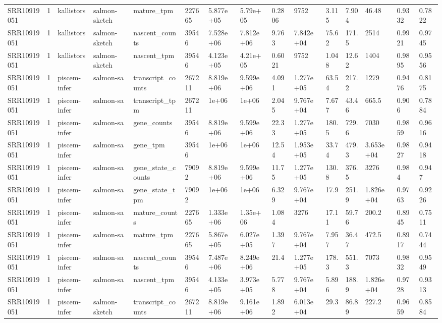 \begin{tabular}{lllllllllllllll}
SRR10919051 & 1 & kallistors & salmon-sketch & mature\_tpm & 227665 & 5.877e+05 & 5.79e+05 & 0.2806 & 9752 & 3.115 & 7.904 & 46.48 & 0.9332 & 0.7822 \\
SRR10919051 & 1 & kallistors & salmon-sketch & nascent\_counts & 39546 & 7.528e+06 & 7.812e+06 & 9.763 & 7.842e+04 & 75.62 & 171.5 & 2514 & 0.9921 & 0.9745 \\
SRR10919051 & 1 & kallistors & salmon-sketch & nascent\_tpm & 39546 & 4.123e+05 & 4.21e+05 & 0.6021 & 9752 & 1.048 & 12.62 & 1404 & 0.9895 & 0.9556 \\
SRR10919051 & 1 & piscem-infer & salmon-sa & transcript\_counts & 267211 & 8.819e+06 & 9.599e+06 & 4.091 & 1.277e+05 & 63.54 & 217.2 & 1279 & 0.9476 & 0.8175 \\
SRR10919051 & 1 & piscem-infer & salmon-sa & transcript\_tpm & 267211 & 1e+06 & 1e+06 & 2.045 & 9.767e+04 & 7.677 & 43.46 & 665.5 & 0.906 & 0.7884 \\
SRR10919051 & 1 & piscem-infer & salmon-sa & gene\_counts & 39546 & 8.819e+06 & 9.599e+06 & 22.33 & 1.277e+05 & 180.5 & 729.6 & 7030 & 0.9859 & 0.9616 \\
SRR10919051 & 1 & piscem-infer & salmon-sa & gene\_tpm & 39546 & 1e+06 & 1e+06 & 12.54 & 1.953e+05 & 33.74 & 479.3 & 3.653e+04 & 0.9827 & 0.9418 \\
SRR10919051 & 1 & piscem-infer & salmon-sa & gene\_state\_counts & 79092 & 8.819e+06 & 9.599e+06 & 11.75 & 1.277e+05 & 130.8 & 376.5 & 3276 & 0.984 & 0.947 \\
SRR10919051 & 1 & piscem-infer & salmon-sa & gene\_state\_tpm & 79092 & 1e+06 & 1e+06 & 6.329 & 9.767e+04 & 17.9 & 251.9 & 1.826e+04 & 0.9763 & 0.9226 \\
SRR10919051 & 1 & piscem-infer & salmon-sa & mature\_counts & 227665 & 1.333e+06 & 1.35e+06 & 1.084 & 3276 & 17.11 & 59.76 & 200.2 & 0.8945 & 0.7511 \\
SRR10919051 & 1 & piscem-infer & salmon-sa & mature\_tpm & 227665 & 5.867e+05 & 6.027e+05 & 1.397 & 9.767e+04 & 7.957 & 36.47 & 472.5 & 0.8917 & 0.7444 \\
SRR10919051 & 1 & piscem-infer & salmon-sa & nascent\_counts & 39546 & 7.487e+06 & 8.249e+06 & 21.4 & 1.277e+05 & 178.3 & 551.3 & 7073 & 0.9832 & 0.9549 \\
SRR10919051 & 1 & piscem-infer & salmon-sa & nascent\_tpm & 39546 & 4.133e+05 & 3.973e+05 & 5.778 & 9.767e+04 & 5.896 & 188.9 & 1.826e+04 & 0.9728 & 0.9313 \\
SRR10919051 & 1 & piscem-infer & salmon-sketch & transcript\_counts & 267211 & 8.819e+06 & 9.161e+06 & 1.892 & 6.013e+04 & 29.3 & 86.89 & 227.2 & 0.9659 & 0.8584 \\

\end{tabular}
